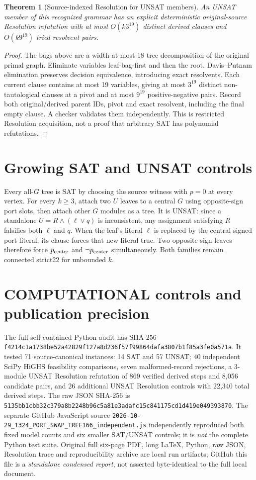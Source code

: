 \documentclass[11pt]{article}
\newtheorem{theorem}{Theorem}
\begin{document}
\begin{theorem}[Source-indexed Resolution for UNSAT members]
An UNSAT member of this recognized grammar has an explicit deterministic original-source Resolution refutation with at most $O(k3^{19})$ distinct derived clauses and $O(k9^{19})$ tried resolvent pairs.
\end{theorem}
\begin{proof}
The bags above are a width-at-most-18 tree decomposition of the original primal graph. Eliminate variables leaf-bag-first and then the root. Davis--Putnam elimination preserves decision equivalence, introducing exact resolvents. Each current clause contains at most 19 variables, giving at most $3^{19}$ distinct non-tautological clauses at a pivot and at most $9^{19}$ positive-negative pairs. Record both original/derived parent IDs, pivot and exact resolvent, including the final empty clause. A checker validates them independently. This is restricted Resolution acquisition, not a proof that arbitrary SAT has polynomial refutations.
\end{proof}

\section{Growing SAT and UNSAT controls}
Every all-$G$ tree is SAT by choosing the source witness with $p=0$ at every vertex. For every $k\ge3$, attach two $U$ leaves to a central $G$ using opposite-sign port slots, then attach other $G$ modules as a tree. It is UNSAT: since a standalone $U=R\land(\ell\lor q)$ is inconsistent, any assignment satisfying $R$ falsifies both $\ell$ and $q$. When the leaf's literal $\ell$ is replaced by the central signed port literal, its clause forces that new literal true. Two opposite-sign leaves therefore force $p_{\rm center}$ and $\neg p_{\rm center}$ simultaneously. Both families remain connected strict22 for unbounded $k$.

\section{COMPUTATIONAL controls and publication precision}
The full self-contained Python audit has SHA-256
\texttt{f4214c1a1738be52a42829f127a8d236f57f99864dafa3807b1f85a3fe0a571a}.
It tested 71 source-canonical instances: 14 SAT and 57 UNSAT; 40 independent SciPy HiGHS feasibility comparisons, seven malformed-record rejections, a 3-module UNSAT Resolution refutation of 869 verified derived steps and 8,056 candidate pairs, and 26 additional UNSAT Resolution controls with 22,340 total derived steps. The raw JSON SHA-256 is
\texttt{5135bb1cbb32c379a8b2248b96c5a81e3adafc15c841175cd1d419e049393870}.
The separate GitHub JavaScript source \texttt{2026-10-29\_1324\_PORT\_SWAP\_TREE166\_independent.js} independently reproduced both fixed model counts and six smaller SAT/UNSAT controls; it is \emph{not} the complete Python test suite. Original full six-page PDF, long LaTeX, Python, raw JSON, Resolution trace and reproducibility archive are local run artifacts; GitHub this file is a \emph{standalone condensed report}, not asserted byte-identical to the full local document.
\end{document}

